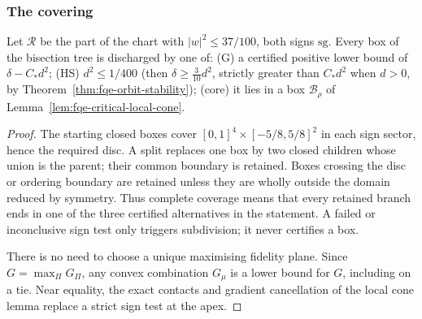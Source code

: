 \subsubsection*{The covering}
\begin{proposition}\label{prop:fqe-critical-covering}
Let $\mathcal R$ be the part of the chart with $|w|^2\le37/100$, both signs $\mathrm{sg}$.  Every box of the bisection tree is
discharged by one of: (G) a certified positive lower bound of $\delta-C_*d^2$; (HS) $d^2\le1/400$ (then
$\delta\ge\frac3{10}d^2$, strictly greater than $C_*d^2$ when $d>0$, by Theorem~\ref{thm:fqe-orbit-stability}); (core) it lies in a box $\mathcal B_\rho$ of
Lemma~\ref{lem:fqe-critical-local-cone}.
\end{proposition}
\begin{proof}
The starting closed boxes cover $[0,1]^4\times[-5/8,5/8]^2$ in each sign sector, hence the required disc.
A split replaces one box by two closed children whose union is the parent; their common boundary is retained.
Boxes crossing the disc or ordering boundary are retained unless they are wholly outside the domain reduced by symmetry.
Thus complete coverage means that every retained branch ends in one of the three certified alternatives in the statement.
A failed or inconclusive sign test only triggers subdivision; it never certifies a box.

There is no need to choose a unique maximising fidelity plane. Since $G=\max_\Pi G_\Pi$,
any convex combination $G_\mu$ is a lower bound for $G$, including on a tie.
Near equality, the exact contacts and gradient cancellation of the local cone lemma replace a strict sign test at the apex.


\end{proof}

